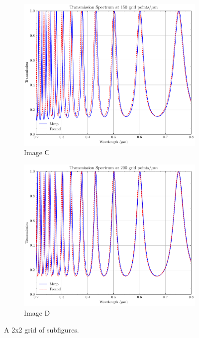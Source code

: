 \begin{figure}[H]
  \vspace{0.5cm}
  
  \begin{subfigure}[b]{0.45\textwidth}
      \centering
      \includegraphics[width=\textwidth]{obrazky-figures/Transmission_eps25.0_h0.3_r150.pdf}
      \caption{Image C}
      \label{fig:subfig3}
  \end{subfigure}
  \hfill
  \begin{subfigure}[b]{0.45\textwidth}
      \centering
      \includegraphics[width=\textwidth]{obrazky-figures/Transmission_eps25.0_h0.3_r200.pdf}
      \caption{Image D}
      \label{fig:subfig4}
  \end{subfigure}
  
  \caption{A 2x2 grid of subfigures.}
  \label{fig:2x2grid}
\end{figure}

